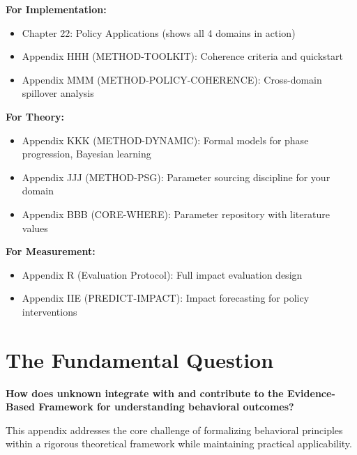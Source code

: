 \textbf{For Implementation:}
\begin{itemize}[nosep]
\item Chapter 22: Policy Applications (shows all 4 domains in action)
\item Appendix HHH (METHOD-TOOLKIT): Coherence criteria and quickstart
\item Appendix MMM (METHOD-POLICY-COHERENCE): Cross-domain spillover analysis
\end{itemize}

\textbf{For Theory:}
\begin{itemize}[nosep]
\item Appendix KKK (METHOD-DYNAMIC): Formal models for phase progression, Bayesian learning
\item Appendix JJJ (METHOD-PSG): Parameter sourcing discipline for your domain
\item Appendix BBB (CORE-WHERE): Parameter repository with literature values
\end{itemize}

\textbf{For Measurement:}
\begin{itemize}[nosep]
\item Appendix R (Evaluation Protocol): Full impact evaluation design
\item Appendix IIE (PREDICT-IMPACT): Impact forecasting for policy interventions
\end{itemize}



\section{The Fundamental Question}
\label{sec:lll-fundamental}

\begin{tcolorbox}[
    colback=red!5!white,
    colframe=red!75!black,
    title={\textbf{Fundamental Question}}
]
\textbf{How does unknown integrate with and contribute to the
Evidence-Based Framework for understanding behavioral outcomes?}

This appendix addresses the core challenge of formalizing behavioral principles
within a rigorous theoretical framework while maintaining practical applicability.
\end{tcolorbox}


